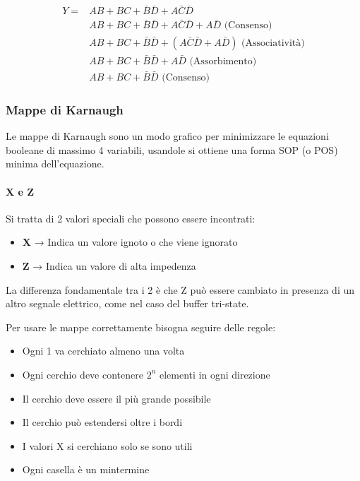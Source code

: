 \documentclass{article}
\begin{document}
\begin{equation}
\nonumber
\begin{split}
    Y = & AB+BC+\bar{B}\bar{D}+A\bar{C}\bar{D}\\ 
    & AB+BC+\bar{B}\bar{D}+A\bar{C}\bar{D}+A\bar{D} \text{ (Consenso)}\\
    & AB+BC+\bar{B}\bar{D}+(A\bar{C}\bar{D}+A\bar{D}) \text{ (Associatività)}\\
    & AB+BC+\bar{B}\bar{D}+A\bar{D} \text{ (Assorbimento)}\\
    & AB+BC+\bar{B}\bar{D} \text{ (Consenso)}
\end{split}
\end{equation}

\subsubsection{Mappe di Karnaugh}

Le mappe di Karnaugh sono un modo grafico per minimizzare le equazioni booleane di massimo 4 variabili, usandole si ottiene una forma SOP (o POS) minima dell'equazione.\newline

\paragraph{X e Z}

Si tratta di 2 valori speciali che possono essere incontrati:
\begin{itemize}
    \item \textbf{X} → Indica un valore ignoto o che viene ignorato
    \item \textbf{Z} → Indica un valore di alta impedenza
\end{itemize}

\vspace{2pt}

La differenza fondamentale tra i 2 è che Z può essere cambiato in presenza di un altro segnale elettrico, come nel caso del buffer tri-state.\newline

\vspace{5pt}

Per usare le mappe correttamente bisogna seguire delle regole:
\begin{itemize}
    \item Ogni 1 va cerchiato almeno una volta
    \item Ogni cerchio deve contenere $2^n$ elementi in ogni direzione
    \item Il cerchio deve essere il più grande possibile
    \item Il cerchio può estendersi oltre i bordi
    \item I valori X si cerchiano solo se sono utili
    \item Ogni casella è un mintermine
\end{itemize}
\end{document}
